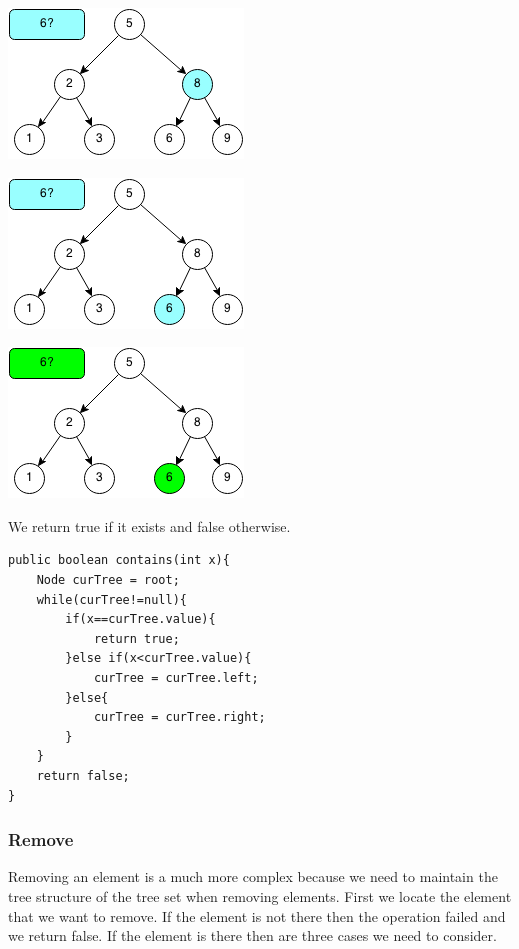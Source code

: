 \documentclass[11pt,oneside]{book}
\makeatletter
\def\maxwidth#1{\ifdim\Gin@nat@width>#1 #1\else\Gin@nat@width\fi}
\makeatother
\begin{document}
\includegraphics[width=\maxwidth{\textwidth}]{bstcontains2.png}

\includegraphics[width=\maxwidth{\textwidth}]{bstcontains3.png}

\includegraphics[width=\maxwidth{\textwidth}]{bstcontains4.png}

We return true if it exists and false otherwise.

\begin{lstlisting}
public boolean contains(int x){
    Node curTree = root;
    while(curTree!=null){
        if(x==curTree.value){
            return true;
        }else if(x<curTree.value){
            curTree = curTree.left;
        }else{
            curTree = curTree.right;
        }
    }
    return false;
}
\end{lstlisting}

\subsubsection{Remove}

Removing an element is a much more complex because we need to maintain the tree structure of the tree set when removing elements. First we locate the element that we want to remove. If the element is not there then the operation failed and we return false. If the element is there then are three cases we need to consider.
\end{document}

